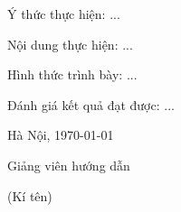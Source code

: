 
 

Ý thức thực hiện: ...

Nội dung thực hiện: ...

Hình thức trình bày: ...

Đánh giá kết quả đạt được: ...

Hà Nội, \today

Giảng viên hướng dẫn

(Kí tên)